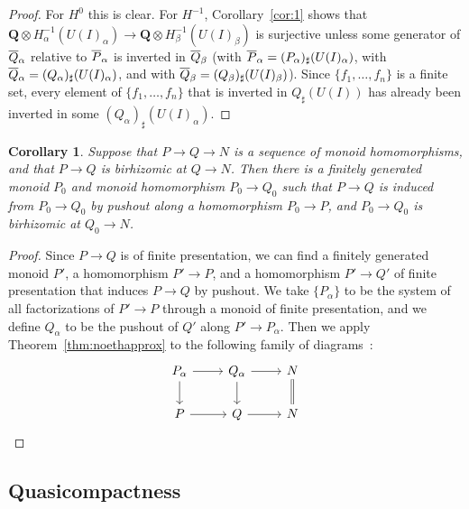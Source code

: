 \documentclass[10pt]{article}
\numberwithin{equation}{section}
\newtheorem{corollary}[paragraph]{Corollary}
\theoremstyle{definition}
\theoremstyle{remark}
\renewcommand{\bar}[1]{\overnorm{#1}\vphantom{#1}}
\def\overnorm#1{\overline{#1}\vphantom{#1}}
\begin{document}
\begin{proof}
	


	For $H^0$ this is clear.  For $H^{-1}$, Corollary~\ref{cor:1} shows that $\mathbf Q \otimes H^{-1}_\alpha(U(I)_\alpha) \to \mathbf Q \otimes H^{-1}_\beta(U(I)_\beta)$ is surjective unless some generator of $\bar Q_\alpha$ relative to $\bar P_\alpha$ is inverted in $\bar Q_\beta$ (with $\bar P_\alpha = (P_\alpha)_\sharp(U(I)_\alpha)$, with $\bar Q_\alpha = (Q_\alpha)_\sharp(U(I)_\alpha)$, and with $\bar Q_\beta = (Q_\beta)_\sharp(U(I)_\beta)$).  Since $\{ f_1, \ldots, f_n \}$ is a finite set, every element of $\{ f_1, \ldots, f_n \}$ that is inverted in $Q_\sharp(U(I))$ has already been inverted in some $(Q_\alpha)_\sharp(U(I)_\alpha)$.
\end{proof}





\begin{corollary}  \label{cor:9}
	Suppose that $P \to Q \to N$ is a sequence of monoid homomorphisms, and that $P \to Q$ is birhizomic at $Q \to N$.  Then there is a finitely generated monoid $P_0$ and monoid homomorphism $P_0 \to Q_0$ such that $P \to Q$ is induced from $P_0 \to Q_0$ by pushout along a homomorphism $P_0 \to P$, and $P_0 \to Q_0$ is birhizomic at $Q_0 \to N$.
\end{corollary}





\begin{proof}
	Since $P \to Q$ is of finite presentation, we can find a finitely generated monoid $P'$, a homomorphism $P' \to P$, and a homomorphism $P' \to Q'$ of finite presentation that induces $P \to Q$ by pushout.  We take $\{ P_\alpha \}$ to be the system of all factorizations of $P' \to P$ through a monoid of finite presentation, and we define $Q_\alpha$ to be the pushout of $Q'$ along $P' \to P_\alpha$.  Then we apply Theorem~\ref{thm:noethapprox} to the following family of diagrams~:
	\begin{equation*} \begin{tikzcd}
		P_\alpha \ar[r] \ar[d] & Q_\alpha \ar[r] \ar[d] & N \ar[d,equals] \\
		P \ar[r] & Q \ar[r] & N
	\end{tikzcd}
	\end{equation*}
\end{proof}





\subsection{Quasicompactness}
\end{document}
